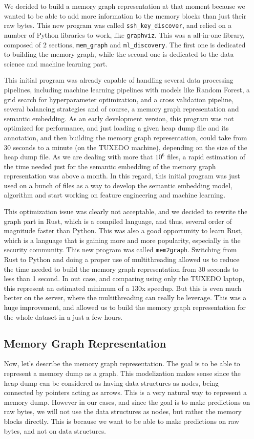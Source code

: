 We decided to build a memory graph representation at that moment because we wanted to be able to add more information to the memory blocks than just their raw bytes. This new program was called \texttt{ssh\_key\_discover}, and relied on a number of Python libraries to work, like \texttt{graphviz}. This was a all-in-one library, composed of 2 sections, \texttt{mem\_graph} and \texttt{ml\_discovery}. The first one is dedicated to building the memory graph, while the second one is dedicated to the data science and machine learning part.

This initial program was already capable of handling several data processing pipelines, including machine learning pipelines with models like Random Forest, a grid search for hyperparameter optimization, and a cross validation pipeline, several balancing strategies and of course, a memory graph representation and semantic embedding. As an early development version, this program was not optimized for performance, and just loading a given heap dump file and its annotation, and then building the memory graph representation, could take from 30 seconds to a minute (on the TUXEDO machine), depending on the size of the heap dump file. As we are dealing with more that $ 10^{6} $ files, a rapid estimation of the time needed just for the semantic embedding of the memory graph representation was above a month. In this regard, this initial program was just used on a bunch of files as a way to develop the semantic embedding model, algorithm and start working on feature engineering and machine learning.

This optimization issue was clearly not acceptable, and we decided to rewrite the graph part in Rust, which is a compiled language, and thus, several order of magnitude faster than Python. This was also a good opportunity to learn Rust, which is a language that is gaining more and more popularity, especially in the security community. This new program was called \texttt{mem2graph}. Switching from Rust to Python and doing a proper use of multithreading allowed us to reduce the time needed to build the memory graph representation from 30 seconds to less than 1 second. In out case, and comparing using only the TUXEDO laptop, this represent an estimated minimum of a 130x speedup. But this is even much better on the server, where the multithreading can really be leverage. This was a huge improvement, and allowed us to build the memory graph representation for the whole dataset in a just a few hours.

\subsection{Memory Graph Representation}
Now, let's describe the memory graph representation. The goal is to be able to represent a memory dump as a graph. This modelization makes sense since the heap dump can be considered as having data structures as nodes, being connected by pointers acting as arrows. This is a very natural way to represent a memory dump. However in our cases, and since the goal is to make predictions on raw bytes, we will not use the data structures as nodes, but rather the memory blocks directly. This is because we want to be able to make predictions on raw bytes, and not on data structures. 

